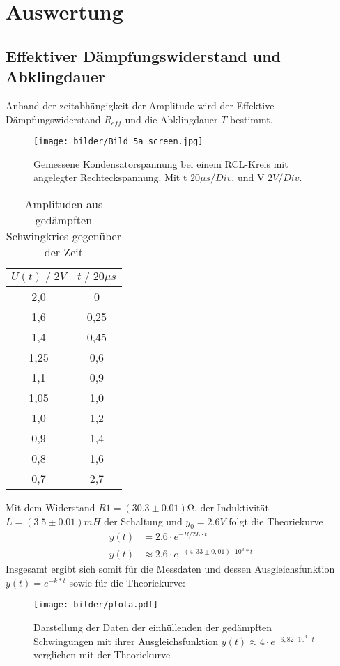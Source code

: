 \newpage
\section{Auswertung}
\subsection{Effektiver Dämpfungswiderstand und Abklingdauer}
Anhand der zeitabhängigkeit der Amplitude wird der Effektive Dämpfungswiderstand $R_{eff}$
und die Abklingdauer $T$ bestimmt. 
\begin{figure}
    \centering
    \texttt{[image: bilder/Bild\_5a\_screen.jpg]}
    \caption{
        Gemessene Kondensatorspannung bei einem RCL-Kreis mit angelegter Rechteckspannung. 
        Mit t $20\mu s/Div.$ und V $ 2V/Div.$
        }
    \label{fig:bild1}
\end{figure}

\begin{table}
    \centering
    \begin{tabular}{c c}
        \toprule
        $U(t)\;/\;2V$ & $t\;/\;20\mu s$\\
        \midrule
        2,0     &0   \\
        1,6     &0,25\\
        1,4     &0,45\\
        1,25    &0,6\\
        1,1     &0,9\\
        1,05    &1,0\\
        1,0     &1,2\\
        0,9     &1,4\\
        0,8     &1,6\\
        0,7     &2,7\\
        \bottomrule
    \end{tabular}
    \caption{Amplituden aus gedämpften Schwingkries gegenüber der Zeit}
    \label{tab:tabelle1}
\end{table}

Mit dem Widerstand $R1=(30.3\pm0.01)\si{\ohm}$, der Induktivität $L=(3.5 \pm 0.01)mH$ der Schaltung und $y_0=2.6V$ folgt die Theoriekurve
\begin{align}
    y(t)&=2.6 \cdot e^{-R/2L \cdot t}\\
    y(t)&\approx 2.6 \cdot e^{-(4,33\pm0,01) \cdot 10^3*t}
\end{align}
\newpage
Insgesamt ergibt sich somit für die Messdaten und dessen Ausgleichsfunktion $y(t)=e^{-k*t}$
sowie für die Theoriekurve:
\begin{figure}
    \centering
    \texttt{[image: bilder/plota.pdf]}
    \caption{
        Darstellung der Daten der einhüllenden der gedämpften Schwingungen mit ihrer
        Ausgleichsfunktion $y(t)\approx 4 \cdot e^{-6,82\cdot10^4 \cdot t}$ verglichen mit der Theoriekurve
    }
    \label{fig:ultra_plot}
\end{figure}




